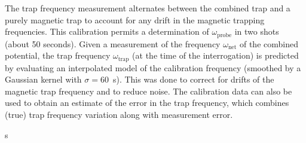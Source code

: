 	The trap frequency measurement alternates between the combined trap and a purely magnetic trap to account for any drift in the magnetic trapping frequencies. 
	This calibration permits a determination of $\omega_\mathrm{probe}$ in two shots (about 50 seconds). 
	Given a measurement of the frequency $\omega_\mathrm{net}$ of the combined potential, the trap frequency $\omega_\mathrm{trap}$ (at the time of the interrogation) is predicted  by evaluating an interpolated model of the calibration frequency (smoothed by a Gaussian kernel with $\sigma=60$~s).
	This was done to correct for drifts of the magnetic trap frequency and to reduce noise. 
	The calibration data can also be used to obtain an estimate of the error in the trap frequency, which combines (true) trap frequency variation along with measurement error. 
	
s
		


	
